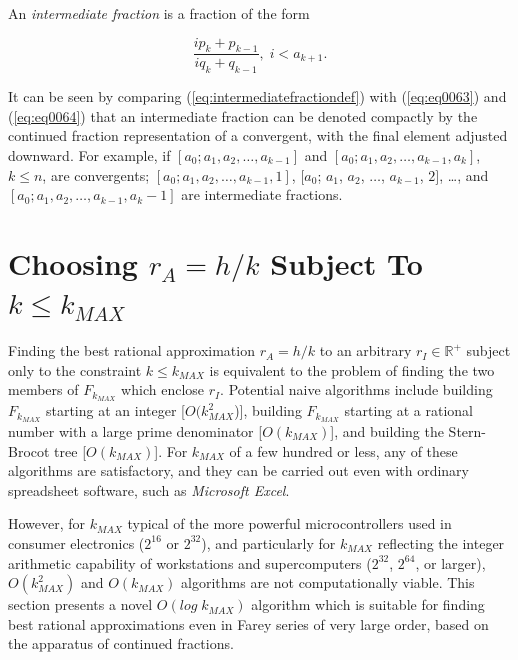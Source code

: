 \documentclass{esub2acm}
\newcommand{\realsetnonneg}{{\mathbb{R}^+}}
\begin{document}
An \emph{intermediate fraction} is a fraction of the form

\begin{equation}
\label{eq:intermediatefractiondef}
\frac{i p_k + p_{k-1}}{i q_k + q_{k-1}}, \; i < a_{k+1}.
\end{equation}

It can be seen by comparing (\ref{eq:intermediatefractiondef}) with
(\ref{eq:eq0063}) and (\ref{eq:eq0064}) that an intermediate fraction
can be denoted compactly by the continued fraction representation of
a convergent, with the final element adjusted downward.  For example,
if $[a_0; a_1, a_2, \ldots , a_{k-1}]$ and $[a_0; a_1, a_2, \ldots , a_{k-1}, a_k]$,
$k \leq n$,
are convergents; $[a_0; a_1, a_2, \ldots , a_{k-1}, 1]$,
$[a_0$; $a_1$, $a_2$, $\ldots$, $a_{k-1}$, $2]$, \ldots{}, and
$[a_0; a_1, a_2, \ldots , a_{k-1}, a_k -1]$ are intermediate fractions.


\section{Choosing $r_A = h/k$ Subject To $k \leq k_{MAX}$}
\label{sec:kmaxonlycase}

Finding the best rational approximation $r_A=h/k$ to an arbitrary
$r_I \in \realsetnonneg$ subject only to the constraint $k \leq k_{MAX}$
is equivalent to the problem of finding the two members
of $F_{k_{MAX}}$ which enclose $r_I$.  Potential naive algorithms
include
building $F_{k_{MAX}}$ starting at an integer [$O(k_{MAX}^2$)],
building $F_{k_{MAX}}$ starting at a rational number with a large
prime denominator [$O(k_{MAX})$], and
building the Stern-Brocot tree [$O(k_{MAX})$].
For $k_{MAX}$ of a few hundred
or less, any of these algorithms are satisfactory, and they can be
carried out even with ordinary spreadsheet software, such as
\emph{Microsoft Excel}.

However, for $k_{MAX}$ typical of the more powerful
microcontrollers used in consumer
electronics ($2^{16}$ or $2^{32}$), and particularly for $k_{MAX}$ reflecting
the integer arithmetic capability of workstations
and supercomputers ($2^{32}$, $2^{64}$, or larger), $O(k_{MAX}^2)$
and $O(k_{MAX})$ algorithms are not computationally viable.  This section
presents a novel $O(log \; k_{MAX})$ algorithm which is suitable for
finding best rational approximations even in Farey series of very large
order, based on the apparatus of continued fractions.
\end{document}
